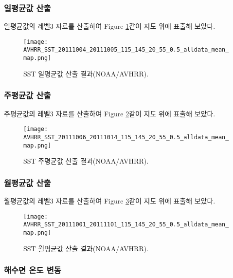 \subsubsection{일평균값 산출}

일평균값의 레벨3 자료를 산출하여 Figure \ref{fig:daily_mean1}\과 같이 지도 위에 표출해 보았다. 

\begin{figure}[htbp]
	\centerline{\texttt{[image: AVHRR\_SST\_20111004\_20111005\_115\_145\_20\_55\_0.5\_alldata\_mean\_map.png]}}
	\caption{SST 일평균값 산출 결과(NOAA/AVHRR).}
	\label{fig:daily_mean1}
\end{figure}

\newpage
\subsubsection{주평균값 산출}

주평균값의 레벨3 자료를 산출하여 Figure \ref{fig:weekly_mean1}\과 같이 지도 위에 표출해 보았다. 

\begin{figure}[htbp]
	\centerline{\texttt{[image: AVHRR\_SST\_20111006\_20111014\_115\_145\_20\_55\_0.5\_alldata\_mean\_map.png]}}
	\caption{SST 주평균값 산출 결과(NOAA/AVHRR).}
	\label{fig:weekly_mean1}
\end{figure}

\newpage
\subsubsection{월평균값 산출}

월평균값의 레벨3 자료를 산출하여 Figure \ref{fig:monthly_mean1}\과 같이 지도 위에 표출해 보았다. 

\begin{figure}[htbp!]
	\centerline{\texttt{[image: AVHRR\_SST\_20111001\_20111101\_115\_145\_20\_55\_0.5\_alldata\_mean\_map.png]}}
	\caption{SST 월평균값 산출 결과(NOAA/AVHRR).}
	\label{fig:monthly_mean1}
\end{figure}

\newpage
\subsubsection{해수면 온도 변동}



